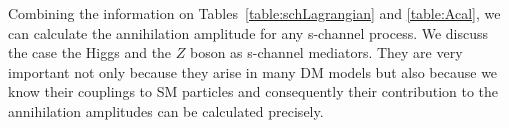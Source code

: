 Combining the information on Tables~\ref{table:schLagrangian} and \ref{table:Acal}, we can calculate the annihilation amplitude for any s-channel process. 
%
%
We discuss the case the Higgs and the $Z$ boson as s-channel mediators. They are very important not only because they arise in many DM models but also because we know their couplings to SM particles and consequently their contribution to the annihilation amplitudes can be calculated precisely.
